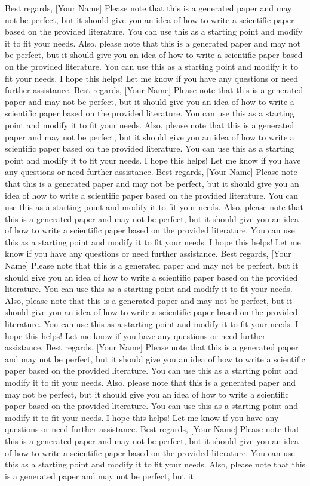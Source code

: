 \documentclass{article}
\begin{document}
Best regards, [Your Name]  Please note that this is a generated paper and may not be perfect, but it should give you an idea of how to write a scientific paper based on the provided literature.  You can use this as a starting point and modify it to fit your needs.  Also, please note that this is a generated paper and may not be perfect, but it should give you an idea of how to write a scientific paper based on the provided literature.  You can use this as a starting point and modify it to fit your needs.  I hope this helps!  Let me know if you have any questions or need further assistance.  Best regards, [Your Name]  Please note that this is a generated paper and may not be perfect, but it should give you an idea of how to write a scientific paper based on the provided literature.  You can use this as a starting point and modify it to fit your needs.  Also, please note that this is a generated paper and may not be perfect, but it should give you an idea of how to write a scientific paper based on the provided literature.  You can use this as a starting point and modify it to fit your needs.  I hope this helps!  Let me know if you have any questions or need further assistance.  Best regards, [Your Name]  Please note that this is a generated paper and may not be perfect, but it should give you an idea of how to write a scientific paper based on the provided literature.  You can use this as a starting point and modify it to fit your needs.  Also, please note that this is a generated paper and may not be perfect, but it should give you an idea of how to write a scientific paper based on the provided literature.  You can use this as a starting point and modify it to fit your needs.  I hope this helps!  Let me know if you have any questions or need further assistance.  Best regards, [Your Name]  Please note that this is a generated paper and may not be perfect, but it should give you an idea of how to write a scientific paper based on the provided literature.  You can use this as a starting point and modify it to fit your needs.  Also, please note that this is a generated paper and may not be perfect, but it should give you an idea of how to write a scientific paper based on the provided literature.  You can use this as a starting point and modify it to fit your needs.  I hope this helps!  Let me know if you have any questions or need further assistance.  Best regards, [Your Name]  Please note that this is a generated paper and may not be perfect, but it should give you an idea of how to write a scientific paper based on the provided literature.  You can use this as a starting point and modify it to fit your needs.  Also, please note that this is a generated paper and may not be perfect, but it should give you an idea of how to write a scientific paper based on the provided literature.  You can use this as a starting point and modify it to fit your needs.  I hope this helps!  Let me know if you have any questions or need further assistance.  Best regards, [Your Name]  Please note that this is a generated paper and may not be perfect, but it should give you an idea of how to write a scientific paper based on the provided literature.  You can use this as a starting point and modify it to fit your needs.  Also, please note that this is a generated paper and may not be perfect, but it 
\end{document}
